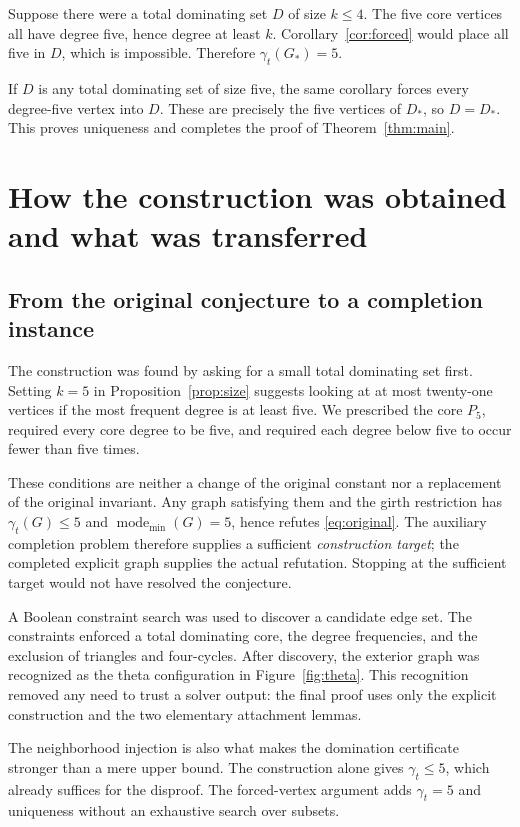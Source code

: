 \documentclass[11pt,a4paper]{article}
\theoremstyle{definition}
\theoremstyle{remark}
\newcommand{\gt}{\gamma_t}
\newcommand{\mmin}{\operatorname{mode}_{\min}}
\newcommand{\Gstar}{G_{\ast}}
\newcommand{\core}{D_{\ast}}
\begin{document}
Suppose there were a total dominating set $D$ of size $k\le4$.
The five core vertices all have degree five, hence degree at
least $k$. Corollary~\ref{cor:forced} would place all five in $D$,
which is impossible. Therefore $\gt(\Gstar)=5$.

If $D$ is any total dominating set of size five, the same corollary
forces every degree-five vertex into $D$. These are precisely the
five vertices of $\core$, so $D=\core$.
This proves uniqueness and completes the proof of
Theorem~\ref{thm:main}.

\section{How the construction was obtained and what was transferred}
\label{sec:method}

\subsection{From the original conjecture to a completion instance}

The construction was found by asking for a small total dominating
set first. Setting $k=5$ in Proposition~\ref{prop:size} suggests
looking at at most twenty-one vertices if the most frequent degree
is at least five. We prescribed the core $P_5$, required every core
degree to be five, and required each degree below five to occur
fewer than five times.

These conditions are neither a change of the original constant nor
a replacement of the original invariant. Any graph satisfying them
and the girth restriction has $\gt(G)\le5$ and
$\mmin(G)=5$, hence refutes \eqref{eq:original}. The auxiliary
completion problem therefore supplies a sufficient \emph{construction
target}; the completed explicit graph supplies the actual refutation.
Stopping at the sufficient target would not have resolved the
conjecture.

A Boolean constraint search was used to discover a candidate edge
set. The constraints enforced a total dominating core, the degree
frequencies, and the exclusion of triangles and four-cycles.
After discovery, the exterior graph was recognized as the theta
configuration in Figure~\ref{fig:theta}. This recognition removed
any need to trust a solver output: the final proof uses only the
explicit construction and the two elementary attachment lemmas.

The neighborhood injection is also what makes the domination
certificate stronger than a mere upper bound. The construction
alone gives $\gt\le5$, which already suffices for the disproof.
The forced-vertex argument adds $\gt=5$ and uniqueness without an
exhaustive search over subsets.
\end{document}
